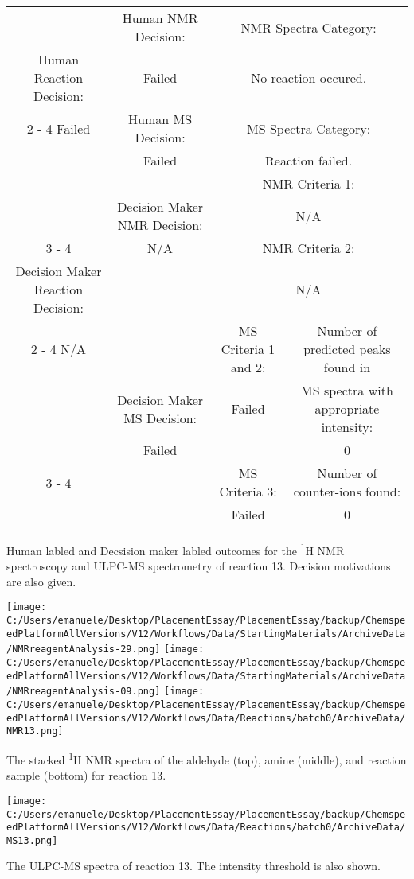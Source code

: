 \documentclass{article}%
\begin{document}
\begin{Decision Table}[H]%
\begin{tabular}{|c|c|c|c|}%
\hline%
&Human NMR Decision:&\multicolumn{2}{|c|}{NMR Spectra Category:}\\%
Human Reaction Decision:&Failed&\multicolumn{2}{|c|}{No reaction occured.}\\%
\cline{2%
-%
4}%
Failed&Human MS Decision:&\multicolumn{2}{|c|}{MS Spectra Category:}\\%
&Failed&\multicolumn{2}{|c|}{Reaction failed.}\\%
\hline%
&&\multicolumn{2}{|c|}{NMR Criteria 1:}\\%
&Decision Maker NMR Decision:&\multicolumn{2}{|c|}{N/A}\\%
\cline{3%
-%
4}%
&N/A&\multicolumn{2}{|c|}{NMR Criteria 2:}\\%
Decision Maker Reaction Decision:&&\multicolumn{2}{|c|}{N/A}\\%
\cline{2%
-%
4}%
N/A&&MS Criteria 1 and 2:&Number of predicted peaks found in\\%
&Decision Maker MS Decision:&Failed&MS spectra with appropriate intensity:\\%
&Failed&&0\\%
\cline{3%
-%
4}%
&&MS Criteria 3:&Number of counter{-}ions found:\\%
&&Failed&0\\%
\hline%
\end{tabular}%
\caption{Human labled and Decsision maker labled outcomes for the \textsuperscript{1}H NMR spectroscopy and ULPC-MS spectrometry of reaction 13. Decision motivations are also given.}%
\end{Decision Table}%
\begin{NMR Spectra}[H]%
\begin{center}%
\texttt{[image: C:/Users/emanuele/Desktop/PlacementEssay/PlacementEssay/backup/ChemspeedPlatformAllVersions/V12/Workflows/Data/StartingMaterials/ArchiveData/NMRreagentAnalysis-29.png]}\hfill%
\texttt{[image: C:/Users/emanuele/Desktop/PlacementEssay/PlacementEssay/backup/ChemspeedPlatformAllVersions/V12/Workflows/Data/StartingMaterials/ArchiveData/NMRreagentAnalysis-09.png]}\hfill%
\texttt{[image: C:/Users/emanuele/Desktop/PlacementEssay/PlacementEssay/backup/ChemspeedPlatformAllVersions/V12/Workflows/Data/Reactions/batch0/ArchiveData/NMR13.png]}\hfill%
\end{center}%
\caption{The stacked \textsuperscript{1}H NMR spectra of the aldehyde (top), amine (middle), and reaction sample (bottom) for reaction 13.}%
\end{NMR Spectra}%
\begin{MS Spectra}[H]%
\begin{center}%
\texttt{[image: C:/Users/emanuele/Desktop/PlacementEssay/PlacementEssay/backup/ChemspeedPlatformAllVersions/V12/Workflows/Data/Reactions/batch0/ArchiveData/MS13.png]}\hfill%
\end{center}%
\caption{The ULPC-MS spectra of reaction 13. The intensity threshold is also shown.}%
\end{MS Spectra}%
\end{document}
